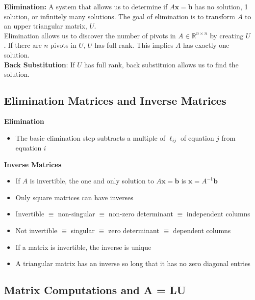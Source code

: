 \documentclass[11pt]{article}
\begin{document}
\textbf{Elimination:} A system that allows us to determine if $A\boldsymbol{x} = \boldsymbol{b}
$ has no solution, 1 solution, or infinitely many solutions. The goal of elimination is to
transform $A$ to an upper triangular matrix, $U$. \\ 

Elimination allows us to discover the number of pivots in $A \in \mathbb{R}^{n \times n}$ by 
creating $U$. If there are $n$ pivots in $U$, $U$ has full rank. This implies $A$ has exactly 
one solution. \\

\textbf{Back Substitution}:
If $U$ has full rank, back substituion allows us to find the solution. \\

\subsection{Elimination Matrices and Inverse Matrices}

\textbf{Elimination}

\begin{itemize}
    \item The basic elimination step subtracts a multiple of $\ell_{ij}$ of equation $j$ from
    equation $i$
\end{itemize}

\textbf{Inverse Matrices}

\begin{itemize}
    \item If $A$ is invertible, the one and only solution to $A\boldsymbol{x} = \boldsymbol{b}$
    is $\boldsymbol{x} = A^{-1}\boldsymbol{b}$
    \item Only square matrices can have inverses
    \item Invertible $\equiv$ non-singular $\equiv$ non-zero determinant $\equiv$ independent 
    columns
    \item Not invertible $\equiv$ singular $\equiv$ zero determinant $\equiv$ dependent columns
    \item If a matrix is invertible, the inverse is unique
    \item A triangular matrix has an inverse so long that it has no zero diagonal entries
\end{itemize}

\subsection{Matrix Computations and A = LU}
\end{document}
